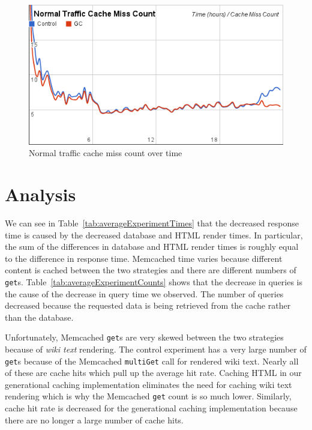 \documentclass[12pt]{ucthesis}
\begin{document}
\begin{figure}[htp]
\centering
\includegraphics[width=\textwidth]{assets/normalMissCountXTime.png}
\caption{Normal traffic cache miss count over time}
\label{fig:normalMissCountXTime}
\end{figure}

\section{Analysis}
We can see in Table~\ref{tab:averageExperimentTimes} that the decreased response time is caused by the decreased database and HTML render times.
In particular, the sum of the differences in database and HTML render times is roughly equal to the difference in response time.
\textsf{Memcached} time varies because different content is cached between the two strategies and there are different numbers of {\tt get}s.
Table~\ref{tab:averageExperimentCounts} shows that the decrease in queries is the cause of the decrease in query time we observed.
The number of queries decreased because the requested data is being retrieved from the cache rather than the database.

Unfortunately, \textsf{Memcached} {\tt get}s are very skewed between the two strategies because of \textit{wiki text} rendering.
The control experiment has a very large number of {\tt get}s because of the \textsf{Memcached} {\tt multiGet} call for rendered wiki text.
Nearly all of these are cache hits which pull up the average hit rate.
Caching HTML in our generational caching implementation eliminates the need for caching wiki text rendering which is why the \textsf{Memcached} {\tt get} count is so much lower.
Similarly, cache hit rate is decreased for the generational caching implementation because there are no longer a large number of cache hits.
\end{document}
